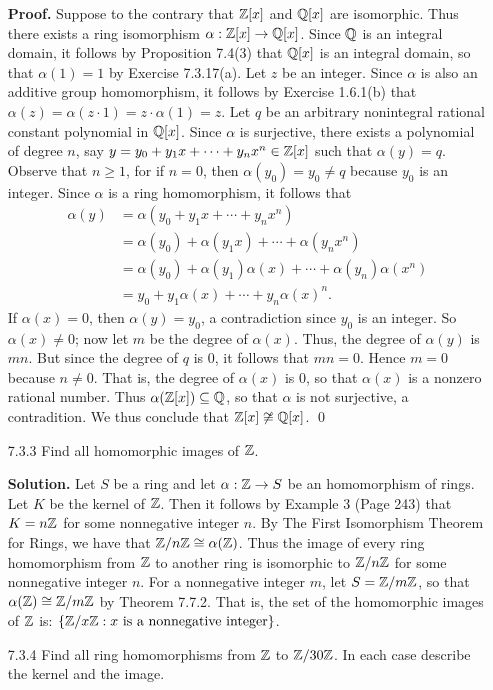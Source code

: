 \begin{enumerate}
      \textbf{Proof.} Suppose to the contrary that $\mathbb{Z}[x]$ and $\mathbb{Q}[x]$ are
      isomorphic. Thus there exists a ring isomorphism
      $\alpha : \mathbb{Z}[x] \rightarrow \mathbb{Q}[x]$. Since $\mathbb{Q}$ is an integral domain, it
      follows by Proposition 7.4(3) that $\mathbb{Q}[x]$ is an integral domain, so that
      $\alpha(1) = 1$ by Exercise 7.3.17(a). Let $z$ be an integer. Since
      $\alpha$ is also an additive group homomorphism, it follows by Exercise
      1.6.1(b) that $\alpha(z) = \alpha(z \cdot 1) = z \cdot \alpha(1) = z$. Let
      $q$ be an arbitrary nonintegral rational constant polynomial in $\mathbb{Q}[x]$.
      Since $\alpha$ is surjective, there exists a polynomial of degree $n$, say
      $y = y_0 + y_1x + \cdots + y_nx^n \in \mathbb{Z}[x]$ such that $\alpha(y) = q$.
      Observe that $n \ge 1$, for if $n = 0$, then $\alpha(y_0) = y_0 \neq q$
      because $y_0$ is an integer. Since $\alpha$ is a ring homomorphism, it 
      follows that
      \begin{align*}
         \alpha(y) &= \alpha(y_0 + y_1x + \cdots + y_nx^n) \\
            &= \alpha(y_0) + \alpha(y_1x) + \cdots + \alpha(y_nx^n) \\
            &= \alpha(y_0) + \alpha(y_1)\alpha(x) + \cdots +
               \alpha(y_n)\alpha(x^n) \\
            &= y_0 + y_1\alpha(x) + \cdots + y_n\alpha(x)^n.
      \end{align*}
      If $\alpha(x) = 0$, then $\alpha(y) = y_0$, a contradiction since $y_0$ is
      an integer. So $\alpha(x) \neq 0$; now let $m$ be the degree of
      $\alpha(x)$. Thus, the degree of $\alpha(y)$ is $mn$. But since the degree
      of $q$ is 0, it follows that $mn = 0$. Hence $m = 0$ because $n \neq 0$.
      That is, the degree of $\alpha(x)$ is 0, so that $\alpha(x)$ is a nonzero
      rational number. Thus $\alpha(\mathbb{Z}[x]) \subseteq \mathbb{Q}$, so that $\alpha$ is
      not surjective, a contradition. We thus conclude that
      $\mathbb{Z}[x]\not\cong \mathbb{Q}[x]$. \qed
   \item[7.3.3]   Find all homomorphic images of $\mathbb{Z}$.

      \textbf{Solution.} Let $S$ be a ring and let $\alpha : \mathbb{Z} \rightarrow S$
      be an homomorphism of rings. Let $K$ be the kernel of $\mathbb{Z}$. Then it
      follows by Example 3 (Page 243) that $K = n\mathbb{Z}$ for some nonnegative
      integer $n$. By The First Isomorphism Theorem for Rings, we have that
      $\mathbb{Z}/n\mathbb{Z} \cong \alpha(\mathbb{Z})$. Thus the image of every ring homomorphism from
      $\mathbb{Z}$ to another ring is isomorphic to $\mathbb{Z}/n\mathbb{Z}$ for some nonnegative
      integer $n$. For a nonnegative integer $m$, let $S = \mathbb{Z}/m\mathbb{Z}$, so that
      $\alpha(\mathbb{Z}) \cong \mathbb{Z}/m\mathbb{Z}$ by Theorem 7.7.2. That is, the set of the
      homomorphic images of $\mathbb{Z}$ is:
      $\{\mathbb{Z}/x\mathbb{Z} : x \text{ is a nonnegative integer}\}$.
   \item[7.3.4]   Find all ring homomorphisms from $\mathbb{Z}$ to $\mathbb{Z}/30\mathbb{Z}$. In each
                  case describe the kernel and the image.


\end{enumerate}
